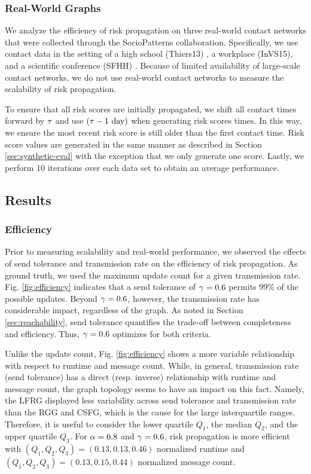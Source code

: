 \subsubsection{Real-World Graphs}

We analyze the efficiency of risk propagation on three real-world contact networks that were collected through the SocioPatterns collaboration. Specifically, we use contact data in the setting of a high school (Thiers13) \citep{Fournet2014}, a workplace (InVS15), and a scientific conference (SFHH) \citep{Genois2018}. Because of limited availability of large-scale contact networks, we do not use real-world contact networks to measure the scalability of risk propagation.

To ensure that all risk scores are initially propagated, we shift all contact times forward by $\tau$ and use $(\tau - 1 \text{ day})$ when generating risk scores times. In this way, we ensure the most recent risk score is still older than the first contact time. Risk score values are generated in the same manner as described in Section \ref{sec:synthetic-eval} with the exception that we only generate one score. Lastly, we perform 10 iterations over each data set to obtain an average performance.

\subsection{Results}

\subsubsection{Efficiency}

Prior to measuring scalability and real-world performance, we observed the effects of send tolerance and transmission rate on the efficiency of risk propagation. As ground truth, we used the maximum update count for a given transmission rate. Fig. \ref{fig:efficiency} indicates that a send tolerance of $\gamma = 0.6$ permits 99\% of the possible updates. Beyond $\gamma = 0.6$, however, the transmission rate has considerable impact, regardless of the graph. As noted in Section \ref{sec:reachability}, send tolerance quantifies the trade-off between completeness and efficiency. Thus, $\gamma = 0.6$ optimizes for both criteria.

Unlike the update count, Fig. \ref{fig:efficiency} shows a more variable relationship with respect to runtime and message count. While, in general, transmission rate (send tolerance) has a direct (resp. inverse) relationship with runtime and message count, the graph topology seems to have an impact on this fact. Namely, the LFRG displayed less variability across send tolerance and transmission rate than the RGG and CSFG, which is the cause for the large interquartile ranges. Therefore, it is useful to consider the lower quartile $Q_1$, the median $Q_2$, and the upper quartile $Q_3$. For $\alpha = 0.8 $ and $\gamma = 0.6$, risk propagation is more efficient with $(Q_{1}, Q_{2}, Q_{3}) = (0.13, 0.13, 0.46)$ normalized runtime and $(Q_{1}, Q_{2}, Q_{3}) = (0.13, 0.15, 0.44)$ normalized message count.

